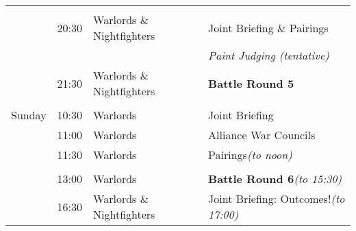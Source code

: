\begin{center}
\begin{tabular}{C{0.75in}C{0.75in}C{2in}L{2.75in}}
                                & & & \\
                                & 20:30 & Warlords \& Nightfighters & Joint Briefing \& Pairings\\
                                &       &                           & \emph{Paint Judging (tentative)}\\
                                & 21:30 & Warlords \& Nightfighters & \textbf{Battle Round 5}\\
\\
   Sunday   & 10:30 & Warlords                  & Joint Briefing\\
            & 11:00 & Warlords                  & Alliance War Councils\\
            & 11:30 & Warlords                  & Pairings\hfill\textit{(to noon)}\\
 & & & \\
            & 13:00 & Warlords                  & \textbf{Battle Round 6}\hfill\textit{(to 15:30)}\\
            & 16:30 & Warlords \& Nightfighters & Joint Briefing: Outcomes!\hfill\textit{(to 17:00)}\\
\end{tabular}
\end{center}
